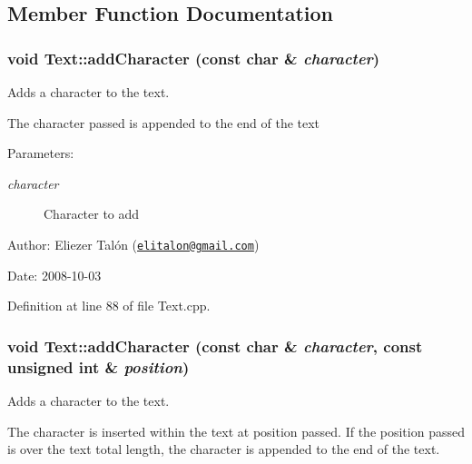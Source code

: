 \subsection{Member Function Documentation}
\hypertarget{class_text_6e6da63c90af68639adc7dd1336f6bf9}{
\subsubsection[addCharacter]{\setlength{\rightskip}{0pt plus 5cm}void Text::addCharacter (const char \& {\em character})}}
\label{class_text_6e6da63c90af68639adc7dd1336f6bf9}


Adds a character to the text. 

The character passed is appended to the end of the text

\begin{Desc}
\item[Parameters:]
\begin{description}
\item[{\em character}]Character to add\end{description}
\end{Desc}
\begin{Desc}
\item[Author:]Eliezer Talón (\href{mailto:elitalon@gmail.com}{\tt elitalon@gmail.com}) \end{Desc}
\begin{Desc}
\item[Date:]2008-10-03 \end{Desc}


Definition at line 88 of file Text.cpp.\hypertarget{class_text_fdd11ad0c90ca483d4cff3d74a64da9e}{
\subsubsection[addCharacter]{\setlength{\rightskip}{0pt plus 5cm}void Text::addCharacter (const char \& {\em character}, \/  const unsigned int \& {\em position})}}
\label{class_text_fdd11ad0c90ca483d4cff3d74a64da9e}


Adds a character to the text. 

The character is inserted within the text at position passed. If the position passed is over the text total length, the character is appended to the end of the text.

